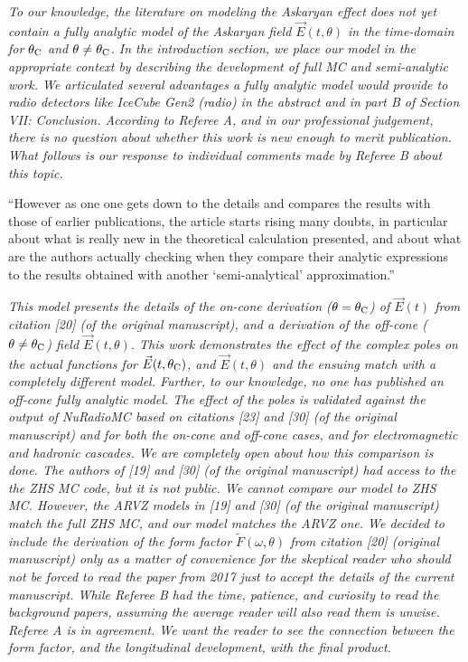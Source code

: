 \documentclass[12pt]{article}
\begin{document}
\textit{To our knowledge, the literature on modeling the Askaryan effect does not yet contain a fully analytic model of the Askaryan field $\vec{E}(t,\theta)$ in the time-domain for $\theta_{\rm C}$ and $\theta \neq \theta_{\rm C}$.  In the introduction section, we place our model in the appropriate context by describing the development of full MC and semi-analytic work.  We articulated several advantages a fully analytic model would provide to radio detectors like IceCube Gen2 (radio) in the abstract and in part B of Section VII: Conclusion.  According to Referee A, and in our professional judgement, there is no question about whether this work is new enough to merit publication.  What follows is our response to individual comments made by Referee B about this topic.}

``However as one one gets down to the details and compares the results with those of earlier publications, the article starts rising many doubts, in particular about what is really new in the theoretical calculation presented, and about what are the authors actually checking when they compare their analytic expressions to the results obtained with another `semi-analytical' approximation.''

\textit{This model presents the details of the on-cone derivation ($\theta = \theta_{\rm C}$) of $\vec{E}(t)$ from citation [20] (of the original manuscript), and a derivation of the off-cone ($\theta \neq \theta_{\rm C}$) field $\vec{E}(t,\theta)$.  This work demonstrates the effect of the complex poles on the actual functions for $\vec{E}(t,\theta_{\rm C})$, and $\vec{E}(t,\theta)$ and the ensuing match with a completely different model.  Further, to our knowledge, no one has published an off-cone fully analytic model.  The effect of the poles is validated against the output of NuRadioMC based on citations [23] and [30] (of the original manuscript) and for both the on-cone and off-cone cases, and for electromagnetic and hadronic cascades.  We are completely open about how this comparison is done.  The authors of [19] and [30] (of the original manuscript) had access to the the ZHS MC code, but it is not public.  We cannot compare our model to ZHS MC.  However, the ARVZ models in [19] and [30] (of the original manuscript) match the full ZHS MC, and our model matches the ARVZ one.  We decided to include the derivation of the form factor $\widetilde{F}(\omega,\theta)$ from citation [20] (original manuscript) only as a matter of convenience for the skeptical reader who should not be forced to read the paper from 2017 just to accept the details of the current manuscript.  While Referee B had the time, patience, and curiosity to read the background papers, assuming the average reader will also read them is unwise.  Referee A is in agreement.  We want the reader to see the connection between the form factor, and the longitudinal development, with the final product.}
\end{document}
